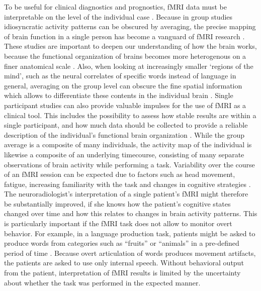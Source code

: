 \documentclass[fleqn,10pt]{SelfArx} %
\begin{document}
To be useful for clinical diagnostics and prognostics, fMRI data must be interpretable on the level of the individual case \citep{Dubois_2016}. Because in group studies idiosyncratic activity patterns can be obscured by averaging, the precise mapping of brain function in a single person has become a vanguard of fMRI research \citep{Laumann_2015, Huth_2016, Gordon_2017}. These studies are important to deepen our understanding of how the brain works, because the functional organization of brains becomes more heterogenous on a finer anatomical scale \citep{Laumann_2015, Poldrack_2017}. Also, when looking at increasingly smaller ‘regions of the mind’, such as the neural correlates of specific words instead of language in general, averaging on the group level can obscure the fine spatial information which allows to differentiate these contents in the individual brain \citep{Huth_2016}. Single participant studies can also provide valuable impulses for the use of fMRI as a clinical tool. This includes the possibility to assess how stable results are within a single participant, and how much data should be collected to provide a reliable description of the individual's functional brain organization \citep{Laumann_201, Gordon_2017}. While the group average is a composite of many individuals, the activity map of the individual is likewise a composite of an underlying timecourse, consisting of many separate observations of brain activity while performing a task. Variability over the course of an fMRI session can be expected due to factors such as head movement, fatigue, increasing familiarity with the task and changes in cognitive strategies \citep{McGonigle_2012, Gorgolewski_2013}. The neuroradiologist's interpretation of a single patient's fMRI might therefore be substantially improved, if she knows how the patient's cognitive states changed over time and how this relates to changes in brain activity patterns. This is particularly important if the fMRI task does not allow to monitor overt behavior. For example, in a language production task, patients might be asked to produce words from categories such as “fruits” or “animals” in a pre-defined period of time \citep{Woermann_2003}. Because overt articulation of words produces movement artifacts, the patients are asked to use only internal speech. Without behavioral output from the patient, interpretation of fMRI results is limited by the uncertainty about whether the task was performed in the expected manner.
\end{document}
